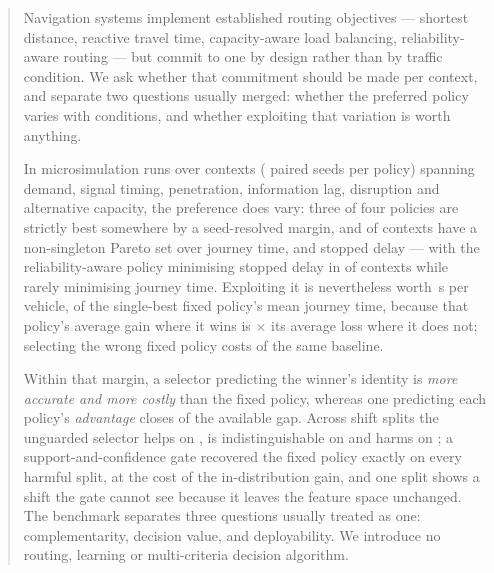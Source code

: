 \begin{abstract}
Navigation systems implement established routing objectives --- shortest
distance, reactive travel time, capacity-aware load balancing,
reliability-aware routing --- but commit to one by design rather than by traffic
condition. We ask whether that commitment should be made per context, and
separate two questions usually merged: whether the preferred policy varies with
conditions, and whether exploiting that variation is worth anything.

In \NumRunsMain{} microsimulation runs over \NumContexts{} contexts
(\NumSeeds{} paired seeds per policy) spanning demand, signal timing,
penetration, information lag, disruption and alternative capacity, the
preference does vary: three of four policies are strictly best somewhere by a
seed-resolved margin, and \NumParetoNonSingleton{} of contexts have a
non-singleton Pareto set over journey time, \CO{} and stopped delay --- with the
reliability-aware policy minimising stopped delay in \NumSpecCThreePct{} of
contexts while rarely minimising journey time. Exploiting it is nevertheless
worth \NumHeadroom\,s per vehicle, \NumHeadroomPct{} of the single-best fixed
policy's mean journey time, because that policy's average gain where it wins is
\NumAsymRatio$\times$ its average loss where it does not; selecting the wrong
fixed policy costs \NumFixedPenPctAbsPOne{} of the same baseline.

Within that margin, a selector predicting the winner's identity is \emph{more
accurate and more costly} than the fixed policy, whereas one predicting each
policy's \emph{advantage} closes \NumBFourGapClosed{} of the available gap.
Across \NumOODNTotal{} shift splits the unguarded selector helps on
\NumOODNHelps{}, is indistinguishable on \NumOODNNeutral{} and harms on
\NumOODNHarms{}; a support-and-confidence gate recovered the fixed policy
exactly on every harmful split, at the cost of the in-distribution gain, and one
split shows a shift the gate cannot see because it leaves the feature space
unchanged. The benchmark separates three questions usually treated as one:
complementarity, decision value, and deployability. We introduce no routing,
learning or multi-criteria decision algorithm.

\end{abstract}
